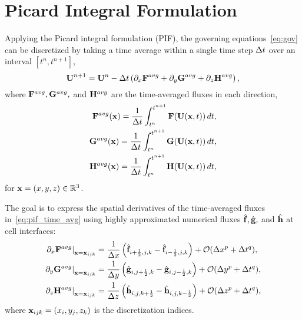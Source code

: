 \section{Picard Integral Formulation}\label{sec:pif}
Applying the Picard integral formulation (PIF), the governing equations~\cref{eq:gov} can be discretized
by taking a time average within a single time step \( \Delta t \) over an interval \( \left[ t^{n}, t^{n + 1} \right] \),
\begin{equation}\label{eq:pif_time_avg}
    \mathbf{U}^{n + 1} = \mathbf{U}^{n} - \Delta t \left( \partial_{x} \mathbf{F}^{avg} + \partial_{y} \mathbf{G}^{avg} + \partial_{z} \mathbf{H}^{avg} \right),
\end{equation}
where \( \mathbf{F}^{avg}, \mathbf{G}^{avg}, \) and \( \mathbf{H}^{avg} \) are the time-averaged fluxes in each direction,
\begin{equation}\label{eq:pif_avg_flux}
    \begin{split}
        \mathbf{F}^{avg} (\mathbf{x}) = \frac{1}{\Delta t} \int_{t^{n}}^{t^{n + 1}} \mathbf{F} (\mathbf{U}(\mathbf{x}, t)) \mathop{dt}, \\
        \mathbf{G}^{avg} (\mathbf{x}) = \frac{1}{\Delta t} \int_{t^{n}}^{t^{n + 1}} \mathbf{G} (\mathbf{U}(\mathbf{x}, t)) \mathop{dt}, \\
        \mathbf{H}^{avg} (\mathbf{x}) = \frac{1}{\Delta t} \int_{t^{n}}^{t^{n + 1}} \mathbf{H} (\mathbf{U}(\mathbf{x}, t)) \mathop{dt}, \\
    \end{split}
\end{equation}
for \( \mathbf{x} = (x, y, z) \in \mathbb{R}^{3} \).

The goal is to express the spatial derivatives of the time-averaged fluxes in~\cref{eq:pif_time_avg}
using highly approximated numerical fluxes \( \hat{\mathbf{f}}, \hat{\mathbf{g}}, \) and \( \hat{\mathbf{h}} \)
at cell interfaces:
\begin{equation}\label{eq:pif_num_flux}
    \begin{split}
        \left. \partial_{x} \mathbf{F}^{avg} \right|_{\mathbf{x} = \mathbf{x}_{ijk}} &=
            \frac{1}{\Delta x} \left( \hat{\mathbf{f}}_{{i+\frac{1}{2}}, j, k} - \hat{\mathbf{f}}_{{i-\frac{1}{2}}, j, k} \right) + \mathcal{O} (\Delta x^{p} + \Delta t^{q}), \\
        \left. \partial_{y} \mathbf{G}^{avg} \right|_{\mathbf{x} = \mathbf{x}_{ijk}} &=
            \frac{1}{\Delta y} \left( \hat{\mathbf{g}}_{i, {j+\frac{1}{2}}, k} - \hat{\mathbf{g}}_{i, {j-\frac{1}{2}}, k} \right) + \mathcal{O} (\Delta y^{p} + \Delta t^{q}), \\
        \left. \partial_{z} \mathbf{H}^{avg} \right|_{\mathbf{x} = \mathbf{x}_{ijk}} &=
            \frac{1}{\Delta z} \left( \hat{\mathbf{h}}_{i, j, {k+\frac{1}{2}}} - \hat{\mathbf{h}}_{i, j, {k-\frac{1}{2}}} \right) + \mathcal{O} (\Delta z^{p} + \Delta t^{q}), \\
    \end{split}
\end{equation}
where \( \mathbf{x}_{ijk} = (x_{i}, y_{j}, z_{k}) \) is the discretization indices.

